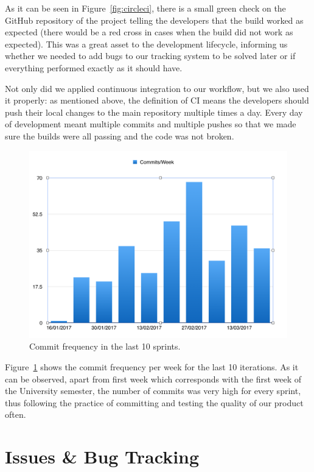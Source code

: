 \documentclass{l4proj}
\begin{document}
As it can be seen in Figure~\ref{fig:circleci}, there is a small green check on the GitHub repository
of the project telling the developers that the build worked as expected (there would be a red cross in cases when the build did not work as expected). This was a great asset to the development lifecycle,
informing us whether we needed to add bugs to our tracking system to be solved later or if everything performed
exactly as it should have.

Not only did we applied continuous integration to our workflow, but we also used it properly: as
mentioned above, the definition of CI means the developers should push their local changes to the main repository
multiple times a day. Every day of development meant multiple commits and multiple pushes so that we made sure the
builds were all passing and the code was not broken.

\begin{figure}[!ht]
    \centering
    \includegraphics[scale=0.5]{commits-week}
    \caption{Commit frequency in the last 10 sprints.}
    \label{fig:commits-week}
\end{figure}

Figure~\ref{fig:commits-week} shows the commit frequency per week for the last 10 iterations. As it can be observed, apart from first week which corresponds with the first week of the University semester, the number of commits was very high for every sprint, thus following the practice of
committing and testing the quality of our product often.

\section{Issues \& Bug Tracking}
\end{document}
